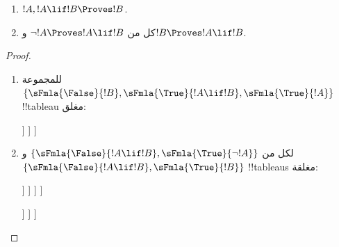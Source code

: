 \documentclass[../../../include/open-logic-section]{subfiles}
\begin{document}
\begin{prop}
  \begin{enumerate}
  \item {}  $!A, !A \lif !B \Proves !B$.
  \item {}
    كل من $\lnot !A \Proves !A \lif !B$ و$!B \Proves !A \lif !B$.
  \end{enumerate}
\end{prop}

\begin{proof}
  \begin{enumerate}
    \item للمجموعة $\{\sFmla{\False}{!B}, \sFmla{\True}{!A \lif !B},
      \sFmla{\True}{!A}\}$ !!{tableau} مغلق:
      \begin{oltableau}
        [\sFmla{\False}{\formula{B}}, just=\TAss
          [\sFmla{\True}{\formula{A} \lif \formula{B}}, just=\TAss
            [\sFmla{\True}{\formula{A}}, just=\TAss
              [\sFmla{\False}{\formula{A}}, just = {\TRule{\True}{\lif}[2]}, close]
              [\sFmla{\True}{\formula{B}}, just = {\TRule{\True}{\lif}[2]}, close]
            ]
          ]
        ]
      \end{oltableau}
    \item لكل من $\{\sFmla{\False}{!A \lif !B},
      \sFmla{\True}{\lnot !A}\}$ و$\{\sFmla{\False}{!A \lif !B},
      \sFmla{\True}{!B}\}$ !!{tableau}s مغلقة:
      \begin{oltableau}
        [\sFmla{\False}{\formula{A} \lif \formula{B}}, just = \TAss
          [\sFmla{\True}{\lnot \formula{A}}, just = \TAss
            [\sFmla{\True}{\formula{A}}, just = {\TRule{\False}{\lif}[1]}
              [\sFmla{\False}{\formula{B}}, just = {\TRule{\False}{\lif}[1]}
                [\sFmla{\False}{\formula{A}}, just = {\TRule{\True}{\lnot}[2]}, close]
              ]
            ]
          ]
        ]
      \end{oltableau}
      \begin{oltableau}
        [\sFmla{\False}{\formula{A} \lif \formula{B}}, just = \TAss
          [\sFmla{\True}{\formula{B}}, just = \TAss
            [\sFmla{\True}{\formula{A}}, just = {\TRule{\False}{\lif}[1]}
              [\sFmla{\False}{\formula{B}}, just = {\TRule{\False}{\lif}[1]},close
              ]
            ]
          ]
        ]
      \end{oltableau}
  \end{enumerate}
\end{proof}
\end{document}
